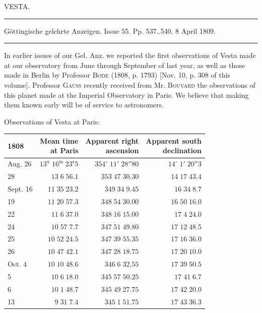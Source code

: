 \begin{center}
VESTA.

\par\vspace{4pt}\hrule\vspace{4pt}

\fontsize{9}{11}\selectfont Göttingische gelehrte Anzeigen. Issue 55. Pp. 537..540. 8 April 1809.

\par\vspace{4pt}\hrule\vspace{4pt}
\end{center}

In earlier issues of our Gel. Anz. we reported the first observations of Vesta made at our observatory from June through September of last year, as well as those made in Berlin by Professor \textsc{Bode} (1808, p. 1793) [Nov. 10, p. 308 of this volume]. Professor \textsc{Gauss} recently received from Mr. \textsc{Bouvard} the observations of this planet made at the Imperial Observatory in Paris. We believe that making them known early will be of service to astronomers.

\begin{center}
Observations of Vesta at Paris:
\end{center}


\begin{center}\fontsize{10}{12}\selectfont\setlength{\tabcolsep}{5pt}\renewcommand{\arraystretch}{1.15}\begin{tabular}{lrrr}
1808 & \shortstack{Mean time\\at Paris} & \shortstack{Apparent right\\ascension} & \shortstack{Apparent south\\declination}\\
\hline
Aug. 26 & $13^{\text{u}}\;16^{\text{m}}\;23^{\text{s}}5$ & $354^\circ\;11'\;28''80$ & $14^\circ\;1'\;20''3$\\
28 & $13\;6\;56.1$ & $353\;47\;30.30$ & $14\;17\;43.4$\\
Sept. 16 & $11\;35\;23.2$ & $349\;34\;9.45$ & $16\;34\;8.7$\\
19 & $11\;20\;57.3$ & $348\;54\;30.00$ & $16\;50\;16.0$\\
22 & $11\;6\;37.0$ & $348\;16\;15.00$ & $17\;4\;24.0$\\
24 & $10\;57\;7.7$ & $347\;51\;49.80$ & $17\;12\;48.5$\\
25 & $10\;52\;24.5$ & $347\;39\;55.35$ & $17\;16\;36.0$\\
26 & $10\;47\;42.1$ & $347\;28\;18.75$ & $17\;20\;10.0$\\
Oct.  4 & $10\;10\;48.6$ & $346\;6\;32.55$ & $17\;39\;50.5$\\
5 & $10\;6\;18.0$ & $345\;57\;50.25$ & $17\;41\;6.7$\\
6 & $10\;1\;48.7$ & $345\;49\;27.75$ & $17\;42\;20.0$\\
13 & $9\;31\;7.4$ & $345\;1\;51.75$ & $17\;43\;36.3$\\
\end{tabular}\end{center}


